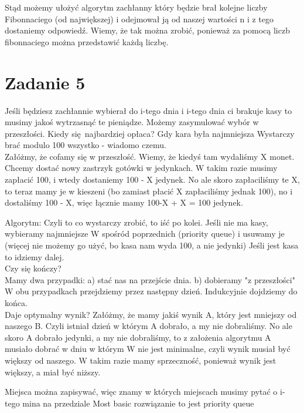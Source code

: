 \documentclass[12pt]{article}
\begin{document}
Stąd możemy ułożyć algorytm zachłanny który będzie brał kolejne liczby Fibonnaciego (od największej) i odejmował ją od naszej wartości n i z tego dostaniemy odpowiedź. Wiemy, że tak można zrobić, ponieważ za pomocą liczb fibonnaciego można przedstawić każdą liczbę.

\section{Zadanie 5}


Jeśli będziesz zachłannie wybierał do i-tego dnia i i-tego dnia ci brakuje kasy to musimy jakoś wytrzasnąć te pieniądze. Możemy zasymulować wybór w przeszłości.
Kiedy się najbardziej opłaca? Gdy kara była najmniejsza
Wystarczy brać modulo 100 wszystko - wiadomo czemu.\\

Załóżmy, że cofamy się w przeszłość. Wiemy, że kiedyś tam wydaliśmy X monet. Chcemy dostać nowy zastrzyk gotówki w jedynkach. W takim razie musimy zapłacić 100, i wtedy dostaniemy 100 - X jedynek. No ale skoro zapłaciliśmy te X, to teraz mamy je w kieszeni (bo zamiast płacić X zapłaciliśmy jednak 100), no i dostaliśmy 100 - X, więc łącznie mamy 100-X + X = 100 jedynek.


Algorytm:
Czyli to co wystarczy zrobić, to iść po kolei.
Jeśli nie ma kasy, wybieramy najmniejsze W spośród poprzednich (priority queue) i usuwamy je (więcej nie możemy go użyć, bo kasa nam wyda 100, a nie jedynki)
Jeśli jest kasa to idziemy dalej.\\


Czy się kończy?\\
Mamy dwa przypadki:
a) stać nas na przejście dnia.
b) dobieramy "z przeszłości"
W obu przypadkach przejdziemy przez następny dzień. Indukcyjnie dojdziemy do końca.\\


Daje optymalny wynik?
Załóżmy, że mamy jakiś wynik A, który jest mniejszy od naszego B.
Czyli istniał dzień w którym A dobrało, a my nie dobraliśmy.
No ale skoro A dobrało jedynki, a my nie dobraliśmy, to z założenia algorytmu A musiało dobrać w dniu w którym W nie jest minimalne, czyli wynik musiał być większy od naszego.
W takim razie mamy sprzeczność, ponieważ wynik jest większy, a miał być niższy.




Miejsca można zapisywać, więc znamy w których miejscach musimy pytać o i-tego mina na przedziale
Most basic rozwiązanie to jest priority queue
\end{document}

